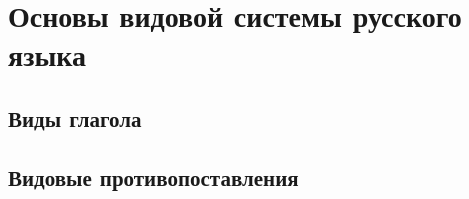 \section{Основы видовой системы русского языка}

\subsection{Виды глагола}

\subsection{Видовые противопоставления}

